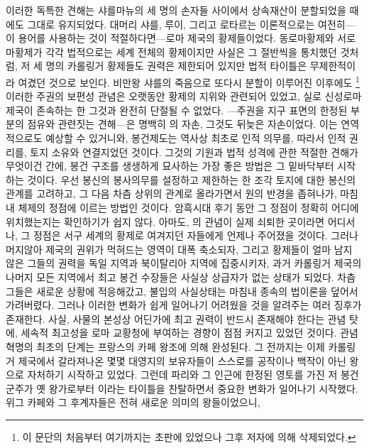 이러한 독특한 견해는 샤를마뉴의 세 명의 손자들 사이에서
상속재산이 분할되었을 때에도 그대로 유지되었다.
대머리 샤를, 루이, 그리고 로타르는 이론적으로는 여전히---이 용어를
사용하는 것이 적절하다면---로마 제국의 황제들이었다.
동로마황제와 서로마황제가 각각 법적으로는 세계 전체의 황제이지만
사실은 그 절반씩을 통치했던 것처럼,
저 세 명의 카롤링거 황제들도 권력은 제한되어 있지만
법적 타이틀은 무제한적이라 여겼던 것으로 보인다.
비만왕 샤를의 죽음으로 또다시 분할이 이루어진 이후에도%
\footnote{이 문단의 처음부터 여기까지는 초판에 있었으나 그후 저자에 의해 삭제되었다.}
이러한 주권의 보편성 관념은
오랫동안 황제의 지위와 관련되어 있었고,
실로 신성로마제국이 존속하는 한 그것과 완전히 단절될 수 없었다.
---주권을 지구 표면의 한정된 부분의 점유와 관련짓는 견해---은
명백히 의 자손, 그것도 뒤늦은 자손이었다.
이는 연역적으로도 예상할 수 있거니와,
봉건제도는 역사상 최초로 인적 의무를, 따라서
인적 권리를, 토지 소유와 연결지었던 것이다.
그것의 기원과 법적 성격에 관한 적절한 견해가 무엇이건 간에,
봉건 구조를 생생하게 묘사하는 가장 좋은 방법은
그 밑바닥부터 시작하는 것이다.
우선 봉신의 봉사의무를 설정하고 제한하는 한 조각 토지에 대한
봉신의 관계를 고려하고,
그 다음 차츰 상위의 관계로 올라가면서 원의 반경을 좁혀나가,
마침내 체제의 정점에 이르는 방법인 것이다.
암흑시대 후기 동안 그 정점이 정확히 어디에 위치했는지는 확인하기가 쉽지 않다.
아마도, 의 관념이 실제 쇠퇴한 곳이라면 어디서나,
그 정점은 서구 세계의 황제로 여겨지던 자들에게 언제나 주어졌을 것이다.
그러나 머지않아 제국의 권위가 먹혀드는 영역이 대폭 축소되자,
그리고 황제들이 얼마 남지 않은 그들의 권력을
독일 지역과 북이탈리아 지역에 집중시키자,
과거 카롤링거 제국의 나머지 모든 지역에서 최고 봉건 수장들은 사실상
상급자가 없는 상태가 되었다.
차츰 그들은 새로운 상황에 적응해갔고,
불입의 사실상태는
마침내 종속의 법이론을 덮어서 가려버렸다.
그러나 이러한 변화가 쉽게 일어나기 어려웠을 것을 알려주는 여러 징후가 존재한다.
사실, 사물의 본성상 어딘가에 최고 권력이 반드시 존재해야 한다는 관념 탓에,
세속적 최고성을 로마 교황청에 부여하는 경향이 점점 커지고 있었던 것이다.
관념 혁명의 최초의 단계는
프랑스의 카페 왕조에 의해 완성된다.
그 전까지는
이제 카롤링거 제국에서 갈라져나온 몇몇 대영지의 보유자들이
스스로를 공작이나 백작이 아닌 왕으로 자처하기 시작하고 있었다.
그런데 파리와 그 인근에 한정된 영토를 가진 저 봉건군주가
옛 왕가로부터 이라는 타이틀을 찬탈하면서
중요한 변화가 일어나기 시작했다.
위그 카페와 그 후계자들은 전혀 새로운 의미의 왕들이었으니,
